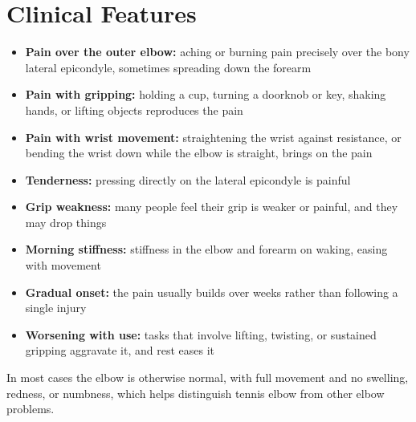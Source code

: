 \section*{Clinical Features}
\begin{itemize}
    \item \textbf{Pain over the outer elbow:} aching or burning pain precisely over the bony lateral epicondyle, sometimes spreading down the forearm
    \item \textbf{Pain with gripping:} holding a cup, turning a doorknob or key, shaking hands, or lifting objects reproduces the pain
    \item \textbf{Pain with wrist movement:} straightening the wrist against resistance, or bending the wrist down while the elbow is straight, brings on the pain
    \item \textbf{Tenderness:} pressing directly on the lateral epicondyle is painful
    \item \textbf{Grip weakness:} many people feel their grip is weaker or painful, and they may drop things
    \item \textbf{Morning stiffness:} stiffness in the elbow and forearm on waking, easing with movement
    \item \textbf{Gradual onset:} the pain usually builds over weeks rather than following a single injury
    \item \textbf{Worsening with use:} tasks that involve lifting, twisting, or sustained gripping aggravate it, and rest eases it
\end{itemize}

In most cases the elbow is otherwise normal, with full movement and no swelling, redness, or numbness, which helps distinguish tennis elbow from other elbow problems.

